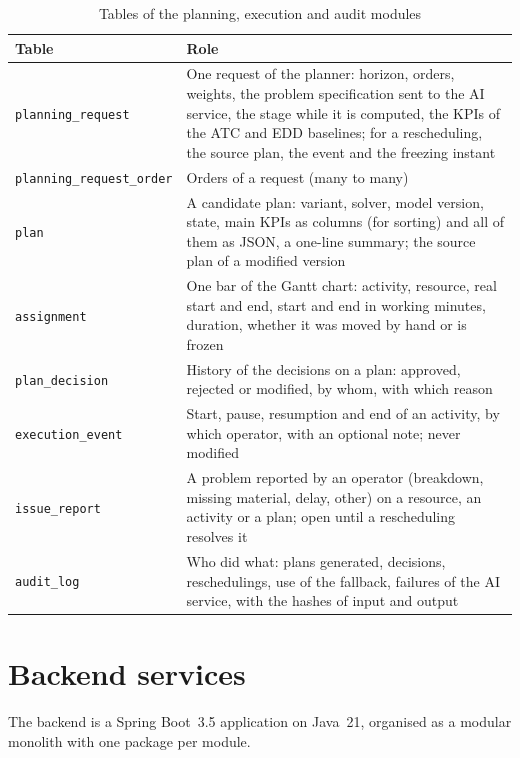 \begin{table}[htpb]
  \centering
  \small
  \begin{tabular}{@{}p{4.5cm}p{9.3cm}@{}}
    \toprule
    \textbf{Table} & \textbf{Role} \\
    \midrule
    \texttt{planning\_request} & One request of the planner: horizon, orders, weights, the problem
      specification sent to the AI service, the stage while it is computed, the KPIs of the ATC
      and EDD baselines; for a rescheduling, the source plan, the event and the freezing
      instant \\
    \texttt{planning\_request\_order} & Orders of a request (many to many) \\
    \texttt{plan} & A candidate plan: variant, solver, model version, state, main KPIs as columns
      (for sorting) and all of them as JSON, a one-line summary; the source plan of a modified
      version \\
    \texttt{assignment} & One bar of the Gantt chart: activity, resource, real start and end,
      start and end in working minutes, duration, whether it was moved by hand or is frozen \\
    \texttt{plan\_decision} & History of the decisions on a plan: approved, rejected or modified,
      by whom, with which reason \\
    \texttt{execution\_event} & Start, pause, resumption and end of an activity, by which
      operator, with an optional note; never modified \\
    \texttt{issue\_report} & A problem reported by an operator (breakdown, missing material,
      delay, other) on a resource, an activity or a plan; open until a rescheduling resolves it \\
    \texttt{audit\_log} & Who did what: plans generated, decisions, reschedulings, use of the
      fallback, failures of the AI service, with the hashes of input and output \\
    \bottomrule
  \end{tabular}
  \caption{Tables of the planning, execution and audit modules}
  \label{tab:planning-tables}
\end{table}

\section{Backend services}
\label{sec:impl-backend}

The backend is a Spring Boot~3.5 application on Java~21, organised as a modular monolith with one
package per module.

